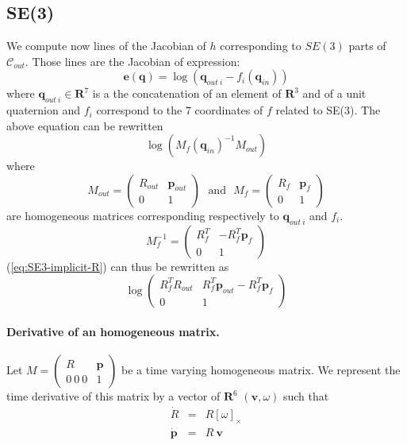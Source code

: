 \documentclass {article}
\newcommand\reals{\mathbf{R}}
\newcommand\CS{\mathcal{C}}
\newcommand\conf{\mathbf{q}}
\begin{document}
\subsection {SE(3)}

We compute now lines of the Jacobian of $h$ corresponding to $SE(3)$ parts of $\CS_{out}$. Those lines are the Jacobian of expression:
\begin{equation}\label{eq:SE3-implicit}
\mathbf{e}(\conf) = \log (\conf_{out\ i} - f_{i}(\conf_{in}))
\end{equation}
where $\conf_{out\ i}\in\reals^7$ is a the concatenation of an element of $\reals^3$ and of a unit quaternion and $f_{i}$ correspond to
the 7 coordinates of $f$ related to SE(3). The above equation can be rewritten
\begin{equation}\label{eq:SE3-implicit-R}
\log (M_{f}(\conf_{in})^{-1} M_{out})
\end{equation}
where
$$
M_{out}=\left(\begin{array}{cc}R_{out} &\mathbf{p}_{out}\\
0 & 1 \end{array}\right)\ \ \  \mbox{and} \ \ \ M_{f}=\left(\begin{array}{cc}R_{f} &\mathbf{p}_{f}\\
0 & 1 \end{array}\right)
$$
are homogeneous matrices corresponding respectively to $\conf_{out\ i}$ and $f_{i}$.
$$
M_{f}^{-1} = \left(\begin{array}{cc}R_{f}^T & -R_{f}^T\mathbf{p}_{f}\\
0 & 1\end{array}\right)
$$
(\ref{eq:SE3-implicit-R}) can thus be rewritten as
$$
\log \left(\begin{array}{cc}
R_{f}^T R_{out} & R_{f}^T\mathbf{p}_{out} - R_{f}^T\mathbf{p}_{f}\\
0 & 1
\end{array}\right)
$$
\paragraph {Derivative of an homogeneous matrix.}

Let $M=\left(\begin {array}{cc} R & \mathbf{p} \\ 0\ 0\ 0 & 1\end{array}\right)$ be a time varying homogeneous matrix. We represent the time derivative of this matrix by a vector of $\reals^6$ $(\mathbf{v},\omega)$ such that
\begin{eqnarray}
\label{eq:omega}
\dot{R} &=& R\left[\omega\right]_{\times}\\
\label{eq:v}
\dot{\mathbf{p}} &=& R\ \mathbf{v}
\end{eqnarray}
\end{document}
